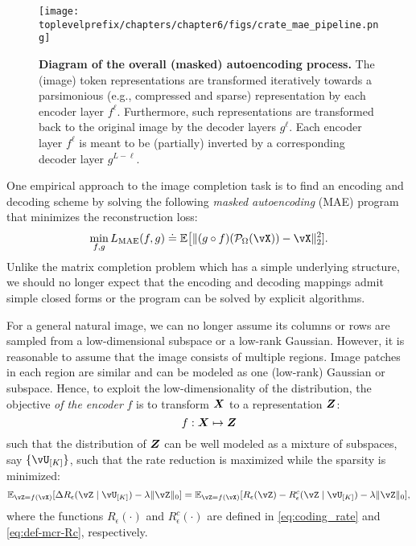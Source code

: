 \documentclass[../../book-main.tex]{subfiles}
\begin{document}
\begin{figure}[t!]
\begin{center}
  \texttt{[image: \\toplevelprefix/chapters/chapter6/figs/crate\_mae\_pipeline.png]}
\end{center}
\caption{\small \textbf{Diagram of the overall  (masked)
  autoencoding process.} The (image) token representations are
  transformed iteratively towards a parsimonious (e.g., compressed
  and sparse) representation by each encoder layer \(f^{\ell}\).
  Furthermore, such representations are transformed back to the
  original image by the decoder layers \(g^{\ell}\). Each encoder
  layer \(f^{\ell}\) is meant to be (partially) inverted by a
corresponding decoder layer \(g^{L - \ell}\).}
\label{fig:crate_mae_pipeline}
\end{figure}

One empirical approach to the image completion task is to find an encoding and decoding scheme by
solving the following {\em masked autoencoding} (MAE) program that
minimizes the reconstruction loss:
\begin{equation}\label{eq:mae_loss}
\min_{f, g} L_{\mathrm{MAE}}(f, g) \doteq \mathbb{E}\big[\norm{(g \circ
f)(\mathcal{P}_\Omega(\vX)) - \vX}_{2}^{2}].
\end{equation}
Unlike the matrix completion problem which has a simple underlying
structure, we should no longer expect that the encoding and decoding
mappings admit simple closed forms or the program can be solved by
explicit algorithms.

For a general natural image, we can no longer assume its columns or
rows are sampled from a low-dimensional subspace or a low-rank
Gaussian. However, it is reasonable to assume that the image consists
of multiple regions. Image patches in each region are similar and can
be modeled as one (low-rank) Gaussian or subspace. Hence, to exploit
the low-dimensionality of the distribution, the objective \textit{of the
encoder} $f$ is to transform $\bm{X}$ to a representation $\bm{Z}$:
\begin{equation}
    f: \bm{X} \mapsto \bm{Z}
\end{equation}
such that the distribution of $\bm{Z}$ can be well modeled as a mixture of subspaces, say $\{\vU_{[K]}\}$,
such that the rate reduction is maximized while the sparsity is minimized:
\begin{equation}\label{eq:sparse_rr}
\mathbb{E}_{\vZ = f(\vX)}[\Delta R_{\epsilon}(\vZ \mid \vU_{[K]}) - \lambda
\norm{\vZ}_{0}] = \mathbb{E}_{\vZ = f(\vX)}[R_\epsilon(\vZ) - R^{c}_\epsilon(\vZ \mid
\vU_{[K]}) - \lambda \norm{\vZ}_{0}],
\end{equation}
where the functions $R_\epsilon(\cdot)$ and $R^c_\epsilon(\cdot)$ are defined in \eqref{eq:coding_rate} and \eqref{eq:def-mcr-Rc}, respectively. 
\end{document}
